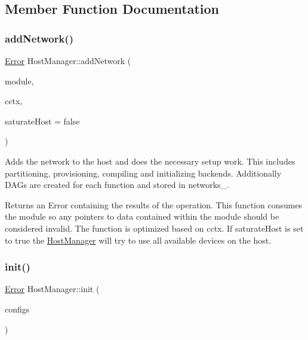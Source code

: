 \subsection{Member Function Documentation}
\mbox{\label{classglow_1_1runtime_1_1_host_manager_a93e479985183392e3405e8e0a38b7516}} 
\subsubsection{\texorpdfstring{add\+Network()}{addNetwork()}}
{\footnotesize\ttfamily \hyperlink{namespaceglow_afdb176c3a672ef66db0ecfc19a8d39bf}{Error} Host\+Manager\+::add\+Network (\begin{DoxyParamCaption}\item[{std\+::unique\+\_\+ptr$<$ \hyperlink{classglow_1_1_module}{Module} $>$}]{module,  }\item[{\hyperlink{structglow_1_1_compilation_context}{Compilation\+Context} \&}]{cctx,  }\item[{bool}]{saturate\+Host = {\ttfamily false} }\end{DoxyParamCaption})}

Adds the network to the host and does the necessary setup work. This includes partitioning, provisioning, compiling and initializing backends. Additionally D\+A\+Gs are created for each function and stored in networks\+\_\+. \begin{DoxyReturn}{Returns}
an Error containing the results of the operation. This function consumes the {\ttfamily module} so any pointers to data contained within the module should be considered invalid. The function is optimized based on {\ttfamily cctx}. If {\ttfamily saturate\+Host} is set to true the \hyperlink{classglow_1_1runtime_1_1_host_manager}{Host\+Manager} will try to use all available devices on the host. 
\end{DoxyReturn}
\mbox{\label{classglow_1_1runtime_1_1_host_manager_aa074ead90b05d6cd00b82b83f142c141}} 
\subsubsection{\texorpdfstring{init()}{init()}}
{\footnotesize\ttfamily \hyperlink{namespaceglow_afdb176c3a672ef66db0ecfc19a8d39bf}{Error} Host\+Manager\+::init (\begin{DoxyParamCaption}\item[{std\+::vector$<$ std\+::unique\+\_\+ptr$<$ \hyperlink{structglow_1_1runtime_1_1_device_config}{Device\+Config} $>$$>$}]{configs }\end{DoxyParamCaption})}

